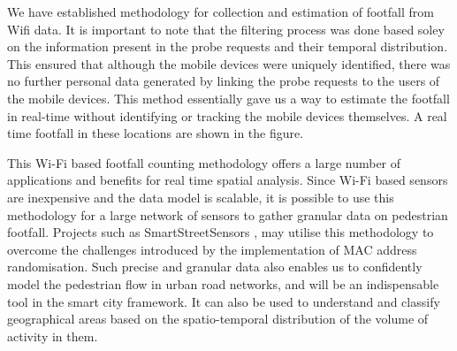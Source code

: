 We have established methodology for collection and estimation of footfall from Wifi data.
It is important to note that the filtering process was done based soley on the information present in the probe requests and their temporal distribution.
This ensured that although the mobile devices were uniquely identified, there was no further personal data generated by linking the probe requests to the users of the mobile devices.
This method essentially gave us a way to estimate the footfall in real-time without identifying or tracking the mobile devices themselves. A real time footfall in these locations are shown in the figure.

This Wi-Fi based footfall counting methodology offers a large number of applications and benefits for real time spatial analysis.
Since Wi-Fi based sensors are inexpensive and the data model is scalable, it is possible to use this methodology for a large network of sensors to gather granular data on pedestrian footfall.
Projects such as SmartStreetSensors \citep{sss2016}, may utilise this methodology to overcome the challenges introduced by the implementation of MAC address randomisation.
Such precise and granular data also enables us to confidently model the pedestrian flow in urban road networks, and will be an indispensable tool in the smart city framework.
It can also be used to understand and classify geographical areas based on the spatio-temporal distribution of the volume of activity in them.
